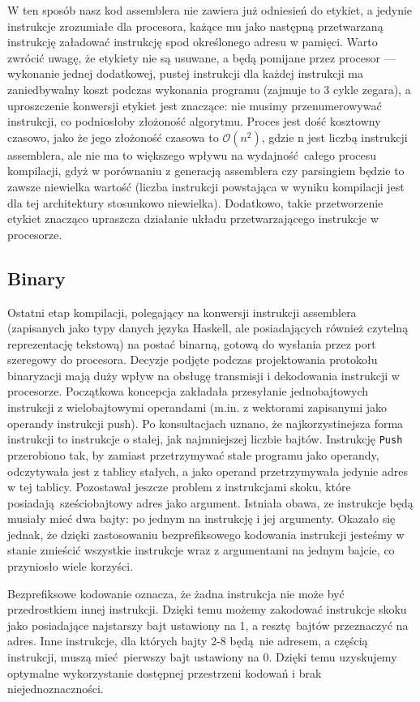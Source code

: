 W ten sposób nasz kod assemblera nie zawiera już odniesień do etykiet, a jedynie instrukcje zrozumiałe dla procesora, każące mu jako następną przetwarzaną instrukcję załadować instrukcję spod określonego adresu w pamięci. Warto zwrócić uwagę, że etykiety nie są usuwane, a będą pomijane przez procesor --- wykonanie jednej dodatkowej, pustej instrukcji dla każdej instrukcji ma zaniedbywalny koszt podczas wykonania programu (zajmuje to 3 cykle zegara), a uproszczenie konwersji etykiet jest znaczące: nie musimy przenumerowywać instrukcji, co podniosłoby złożoność algorytmu. Proces jest dość kosztowny czasowo, jako że jego złożoność czasowa to $\mathcal{O}(n^2)$, gdzie n jest liczbą instrukcji assemblera, ale nie ma to większego wpływu na wydajność całego procesu kompilacji, gdyż w porównaniu z generacją assemblera czy parsingiem będzie to zawsze niewielka wartość (liczba instrukcji powstająca w wyniku kompilacji jest dla tej architektury stosunkowo niewielka). Dodatkowo, takie przetworzenie etykiet znacząco upraszcza działanie układu przetwarzającego instrukcje w procesorze.


\subsection{Binary}

Ostatni etap kompilacji, polegający na konwersji instrukcji assemblera (zapisanych jako typy danych języka Haskell, ale posiadających również czytelną reprezentację tekstową) na postać binarną, gotową do wysłania przez port szeregowy do procesora. Decyzje podjęte podczas projektowania protokołu binaryzacji mają duży wpływ na obsługę transmisji i dekodowania instrukcji w procesorze. Początkowa koncepcja zakładała przesyłanie jednobajtowych instrukcji z wielobajtowymi operandami (m.in. z wektorami zapisanymi jako operandy instrukcji push). Po konsultacjach uznano, że najkorzystinejsza forma instrukcji to instrukcje o stałej, jak najmniejszej liczbie bajtów. Instrukcję \texttt{Push} przerobiono tak, by zamiast przetrzymywać stałe programu jako operandy, odczytywała jest z tablicy stałych, a jako operand przetrzymywała jedynie adres w tej tablicy. Pozostawał jeszcze problem z instrukcjami skoku, które posiadają sześciobajtowy adres jako argument. Istniała obawa, ze instrukcje będą musiały mieć dwa bajty: po jednym na instrukcję i jej argumenty. Okazało się jednak, że dzięki zastosowaniu bezprefiksowego kodowania instrukcji jesteśmy w stanie zmieścić wszystkie instrukcje wraz z argumentami na jednym bajcie, co przyniosło wiele korzyści.

Bezprefiksowe kodowanie oznacza, że żadna instrukcja nie może być przedrostkiem innej instrukcji. Dzięki temu możemy zakodować instrukcje skoku jako posiadające najstarszy bajt ustawiony na 1, a resztę bajtów przeznaczyć na adres. Inne instrukcje, dla których bajty 2-8 będą nie adresem, a częścią instrukcji, muszą mieć pierwszy bajt ustawiony na 0. Dzięki temu uzyskujemy optymalne wykorzystanie dostępnej przestrzeni kodowań i brak niejednoznaczności.
